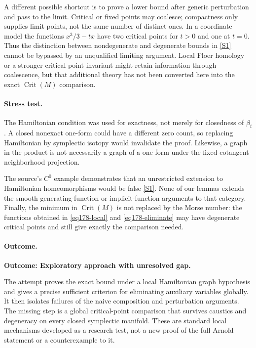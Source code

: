 \documentclass[11pt,a4paper]{article}
\newcommand{\sref}[2]{\hyperlink{source:#1:#2}{[S#2]}}
\numberwithin{equation}{section}
\begin{document}
A different possible shortcut is to prove a lower bound after generic
perturbation and pass to the limit. Critical or fixed points may coalesce;
compactness only supplies limit points, not the same number of distinct
ones. In a coordinate model the functions
$x^3/3-tx$ have two critical points for $t>0$ and one at $t=0$.
Thus the distinction between nondegenerate and degenerate bounds in
\sref{statement}{1} cannot be bypassed by an unqualified limiting argument.
Local Floer homology or a stronger critical-point invariant might retain
information through coalescence, but that additional theory has not been
converted here into the exact $\operatorname{Crit}(M)$ comparison.

\paragraph{Stress test.}
The Hamiltonian condition was used for exactness, not merely for closedness
of $\beta_t$. A closed nonexact one-form could have a different zero count,
so replacing Hamiltonian by symplectic isotopy would invalidate the proof.
Likewise, a graph in the product is not necessarily a graph of a one-form
under the fixed cotangent-neighborhood projection.

The source's $C^0$ example demonstrates that an unrestricted extension to
Hamiltonian homeomorphisms would be false \sref{statement}{1}. None of our lemmas
extends the smooth generating-function or implicit-function arguments to
that category. Finally, the minimum in $\operatorname{Crit}(M)$ is not
replaced by the Morse number: the functions obtained in
\eqref{eq178-local} and \eqref{eq178-eliminate} may have degenerate
critical points and still give exactly the comparison needed.

\paragraph{Outcome.}
\textbf{Outcome: Exploratory approach with unresolved gap.}

The attempt proves the exact bound under a local Hamiltonian graph
hypothesis and gives a precise sufficient criterion for eliminating
auxiliary variables globally. It then isolates failures of the naive
composition and perturbation arguments. The missing step is a global
critical-point comparison that survives caustics and degeneracy on every
closed symplectic manifold. These are standard local mechanisms developed
as a research test, not a new proof of the full Arnold statement or a
counterexample to it.
\end{document}
